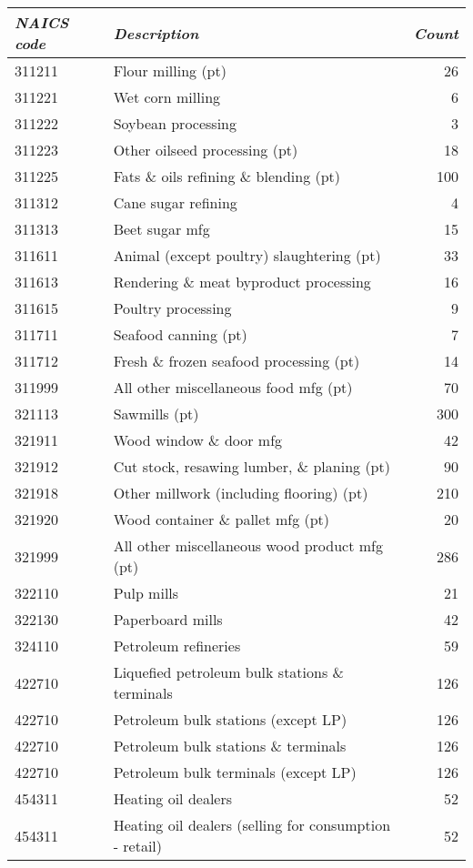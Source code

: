 \begin{tabular}{l | l | r}
\textit{NAICS code} & \textit{Description} & \textit{Count} \\
\hline
311211 & Flour milling (pt) & 26 \\
311221 & Wet corn milling & 6 \\
311222 & Soybean processing & 3 \\
311223 & Other oilseed processing (pt) & 18 \\
311225 & Fats \& oils refining \& blending (pt) & 100 \\
311312 & Cane sugar refining & 4 \\
311313 & Beet sugar mfg & 15 \\
311611 & Animal (except poultry) slaughtering (pt) & 33 \\
311613 & Rendering \& meat byproduct processing & 16 \\
311615 & Poultry processing & 9 \\
311711 & Seafood canning (pt) & 7 \\
311712 & Fresh \& frozen seafood processing (pt) & 14 \\
311999 & All other miscellaneous food mfg (pt) & 70 \\
321113 & Sawmills (pt) & 300 \\
321911 & Wood window \& door mfg & 42 \\
321912 & Cut stock, resawing lumber, \& planing (pt) & 90 \\
321918 & Other millwork (including flooring) (pt) & 210 \\
321920 & Wood container \& pallet mfg (pt) & 20 \\
321999 & All other miscellaneous wood product mfg (pt) & 286 \\
322110 & Pulp mills & 21 \\
322130 & Paperboard mills & 42 \\
324110 & Petroleum refineries & 59 \\
422710 & Liquefied petroleum bulk stations \& terminals & 126 \\
422710 & Petroleum bulk stations (except LP) & 126 \\
422710 & Petroleum bulk stations \& terminals & 126 \\
422710 & Petroleum bulk terminals (except LP) & 126 \\
454311 & Heating oil dealers & 52 \\
454311 & Heating oil dealers (selling for consumption - retail) & 52 \\

\end{tabular}
